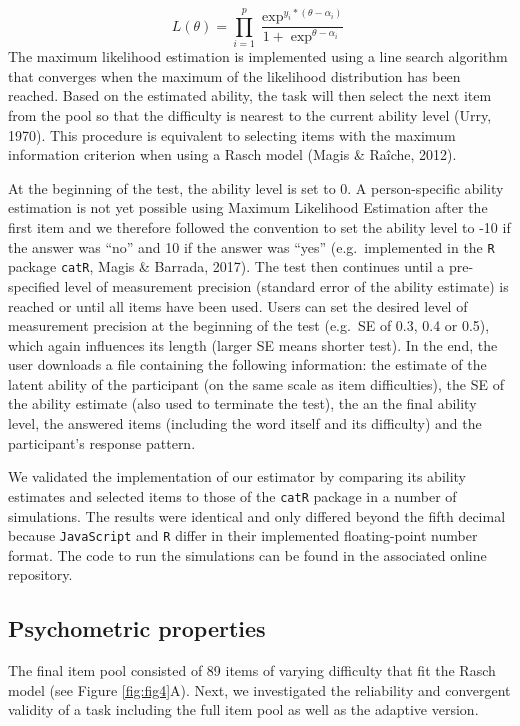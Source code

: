 \documentclass[
  man,floatsintext]{apa6}
\begin{document}
\[
L(\theta) = \prod_{i = 1}^{p} \frac{\exp^{y_i * (\theta - \alpha_i)}}{1 + \exp^{\theta - \alpha_i}}
\] The maximum likelihood estimation is implemented using a line search algorithm that converges when the maximum of the likelihood distribution has been reached. Based on the estimated ability, the task will then select the next item from the pool so that the difficulty is nearest to the current ability level (Urry, 1970). This procedure is equivalent to selecting items with the maximum information criterion when using a Rasch model (Magis \& Raîche, 2012).

At the beginning of the test, the ability level is set to 0. A person-specific ability estimation is not yet possible using Maximum Likelihood Estimation after the first item and we therefore followed the convention to set the ability level to -10 if the answer was ``no'' and 10 if the answer was ``yes'' (e.g.~implemented in the \texttt{R} package \texttt{catR}, Magis \& Barrada, 2017). The test then continues until a pre-specified level of measurement precision (standard error of the ability estimate) is reached or until all items have been used. Users can set the desired level of measurement precision at the beginning of the test (e.g.~SE of 0.3, 0.4 or 0.5), which again influences its length (larger SE means shorter test). In the end, the user downloads a file containing the following information: the estimate of the latent ability of the participant (on the same scale as item difficulties), the SE of the ability estimate (also used to terminate the test), the an the final ability level, the answered items (including the word itself and its difficulty) and the participant's response pattern.

We validated the implementation of our estimator by comparing its ability estimates and selected items to those of the \texttt{catR} package in a number of simulations. The results were identical and only differed beyond the fifth decimal because \texttt{JavaScript} and \texttt{R} differ in their implemented floating-point number format. The code to run the simulations can be found in the associated online repository.

\hypertarget{psychometric-properties}{%
\subsection{Psychometric properties}\label{psychometric-properties}}

The final item pool consisted of 89 items of varying difficulty that fit the Rasch model (see Figure \ref{fig:fig4}A). Next, we investigated the reliability and convergent validity of a task including the full item pool as well as the adaptive version.
\end{document}
